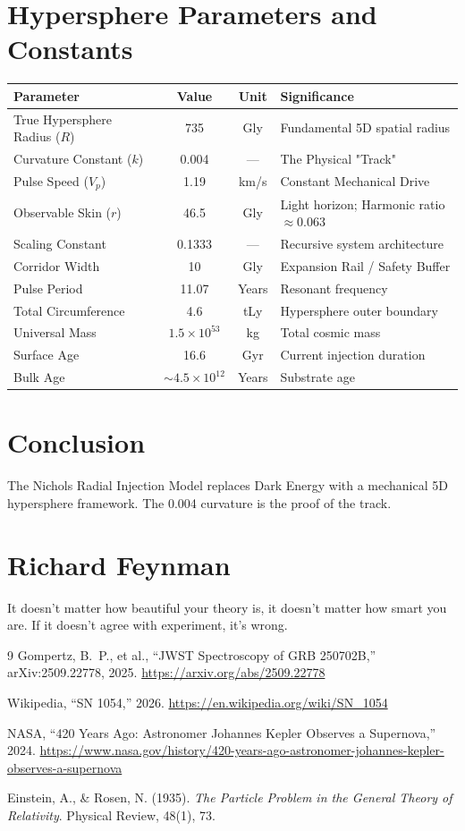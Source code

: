 \documentclass[11pt,a4paper]{article}
\begin{document}
\section{Hypersphere Parameters and Constants}
\begin{longtable}{|p{3.5cm}|c|c|p{3.5cm}|}
\hline
\textbf{Parameter} & \textbf{Value} & \textbf{Unit} & \textbf{Significance} \\ \hline
True Hypersphere Radius ($R$) & 735 & Gly & Fundamental 5D spatial radius \\ \hline
Curvature Constant ($k$) & 0.004 & --- & The Physical "Track" \\ \hline
Pulse Speed ($V_p$) & 1.19 & km/s & Constant Mechanical Drive \\ \hline
Observable Skin ($r$) & 46.5 & Gly & Light horizon; Harmonic ratio $\approx 0.063$ \\ \hline
Scaling Constant & 0.1333 & --- & Recursive system architecture \\ \hline
Corridor Width & 10 & Gly & Expansion Rail / Safety Buffer \\ \hline
Pulse Period & 11.07 & Years & Resonant frequency \\ \hline
Total Circumference & 4.6 & tLy & Hypersphere outer boundary \\ \hline
Universal Mass & $1.5\times10^{53}$ & kg & Total cosmic mass \\ \hline
Surface Age & 16.6 & Gyr & Current injection duration \\ \hline
Bulk Age & $\sim4.5\times10^{12}$ & Years & Substrate age \\ \hline
\end{longtable}

\section{Conclusion}
The Nichols Radial Injection Model replaces Dark Energy with a mechanical 5D hypersphere framework. The 0.004 curvature is the proof of the track.

\section{Richard Feynman}
It doesn't matter how beautiful your theory is, it doesn't matter how smart you are. If it doesn't agree with experiment, it's wrong.

\begin{thebibliography}{9}
Gompertz, B.\ P., et al.,
``JWST Spectroscopy of GRB 250702B,''
arXiv:2509.22778, 2025.
\url{https://arxiv.org/abs/2509.22778}

Wikipedia,
``SN 1054,''
2026.
\url{https://en.wikipedia.org/wiki/SN_1054}

NASA,
``420 Years Ago: Astronomer Johannes Kepler Observes a Supernova,''
2024.
\url{https://www.nasa.gov/history/420-years-ago-astronomer-johannes-kepler-observes-a-supernova}

Einstein, A., \& Rosen, N. (1935).
\textit{The Particle Problem in the General Theory of Relativity}.
Physical Review, 48(1), 73.
\end{thebibliography}
\newpage
\end{document}
